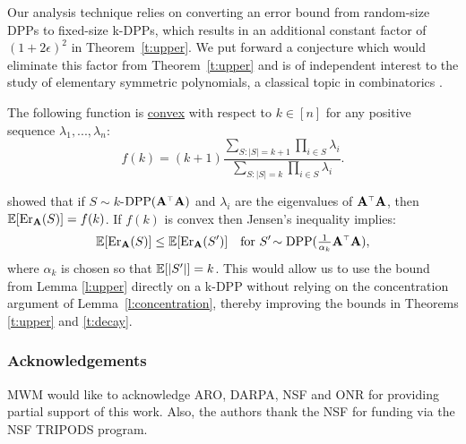 \documentclass{article}
\begin{document}
Our analysis technique relies on converting an error bound
from random-size DPPs to fixed-size k-DPPs, which results in an
additional constant factor of $(1+2\epsilon)^2$ in Theorem~\ref{t:upper}.
We put forward a
conjecture which would eliminate this factor from
Theorem~\ref{t:upper} and is of independent interest to the study of 
elementary symmetric polynomials, a classical topic in combinatorics
\citep{HLP-Inequalities}. 
\begin{conjecture}\label{c:convex}
  The following function is \underline{convex} with respect to $k\in[n]$ for any
  positive sequence $\lambda_1,...,\lambda_n$:
 \[f(k)=(k+1)\frac{\sum_{S:|S|=k+1}\prod_{i\in S}\lambda_i}{\sum_{S:|S|=k}\prod_{i\in S}\lambda_i}.\]
\end{conjecture}
\citet{pca-volume-sampling} showed that if $S\sim
k$-$\DPP(\A^\top\A)$ and $\lambda_i$ are the eigenvalues of
$\A^\top\A$, then $\mathbb E[\mathrm{Er}_\mathbf A(S)]=f(k)$. If $f(k)$ is convex then
Jensen's inequality implies:
\begin{align*}
  \E[\Er_\A(S)]\leq \E[\Er_\A(S')]\quad\text{for }S'\!\sim\DPP(\tfrac1{\alpha_k}\A^\top\A),
\end{align*}
where $\alpha_k$ is chosen so that $\mathbb E[|S'|]=k$. This would allow us to use
the bound from Lemma \ref{l:upper} directly on a k-DPP
without relying on the concentration argument of
Lemma~\ref{l:concentration}, thereby improving the bounds in
Theorems \ref{t:upper} and \ref{t:decay}.

\subsubsection*{Acknowledgements}

MWM would like to acknowledge ARO, DARPA, NSF and ONR for providing partial
  support of this work. Also, the authors thank the NSF for funding
  via the NSF TRIPODS program.
    




  \newpage
  \appendix
  \onecolumn
\end{document}
